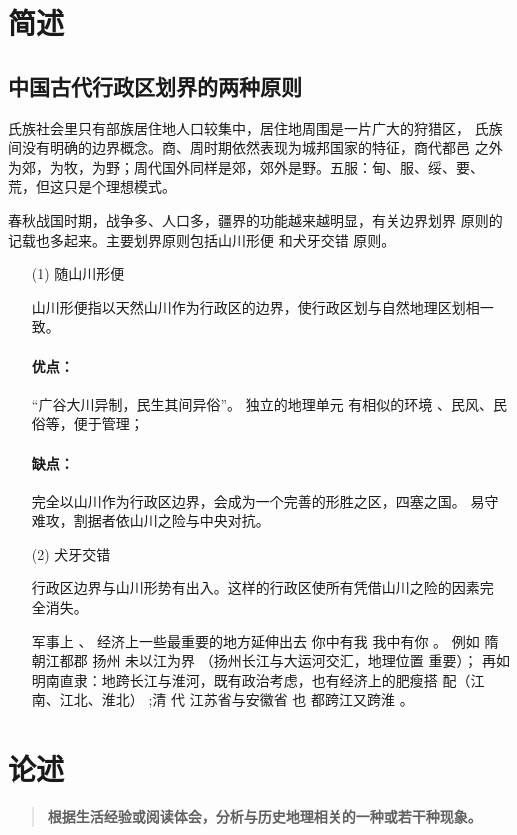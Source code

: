 \documentclass[UTF8,a4paper]{ctexart}
\begin{document}
\section{简述}
\subsection{中国古代行政区划界的两种原则}
氏族社会里只有部族居住地人口较集中，居住地周围是一片广大的狩猎区，
氏族间没有明确的边界概念。商、周时期依然表现为城邦国家的特征，商代都邑
之外为郊，为牧，为野；周代国外同样是郊，郊外是野。五服：甸、服、绥、要、
荒，但这只是个理想模式。
\par
春秋战国时期，战争多、人口多，疆界的功能越来越明显，有关边界划界
原则的记载也多起来。主要划界原则包括山川形便 和犬牙交错 原则。
\begin{enumerate}

    \item [(1)]
    随山川形便 

    山川形便指以天然山川作为行政区的边界，使行政区划与自然地理区划相一致。
    \paragraph{优点：}“广谷大川异制，民生其间异俗”。 独立的地理单元 有相似的环境 、民风、民俗等，便于管理；
    \paragraph{缺点：}完全以山川作为行政区边界，会成为一个完善的形胜之区，四塞之国。    易守难攻，割据者依山川之险与中央对抗。
    \item [(2)] 犬牙交错 

    行政区边界与山川形势有出入。这样的行政区使所有凭借山川之险的因素完
全消失。\par
军事上
、 经济上一些最重要的地方延伸出去 你中有我 我中有你 。
例如
隋朝江都郡 扬州 未以江为界 （扬州长江与大运河交汇，地理位置
重要）； 再如 明南直隶：地跨长江与淮河，既有政治考虑，也有经济上的肥瘦搭
配（江南、江北、淮北） ;清 代 江苏省与安徽省 也 都跨江又跨淮 。


\end{enumerate}

\section{论述}
\begin{quote}
    \bfseries 根据生活经验或阅读体会，分析与历史地理相关的一种或若干种现象。
\end{quote}
\end{document}

